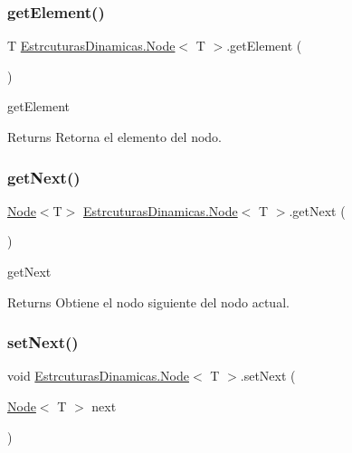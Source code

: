 \subsubsection{\texorpdfstring{get\+Element()}{getElement()}}
{\footnotesize\ttfamily T \mbox{\hyperlink{class_estrcuturas_dinamicas_1_1_node}{Estrcuturas\+Dinamicas.\+Node}}$<$ T $>$.get\+Element (\begin{DoxyParamCaption}{ }\end{DoxyParamCaption})}



get\+Element 

\begin{DoxyReturn}{Returns}
Retorna el elemento del nodo.
\end{DoxyReturn}
\mbox{\label{class_estrcuturas_dinamicas_1_1_node_a93966d358beb06f39a4b6648fda1d04c}} 
\subsubsection{\texorpdfstring{get\+Next()}{getNext()}}
{\footnotesize\ttfamily \mbox{\hyperlink{class_estrcuturas_dinamicas_1_1_node}{Node}}$<$T$>$ \mbox{\hyperlink{class_estrcuturas_dinamicas_1_1_node}{Estrcuturas\+Dinamicas.\+Node}}$<$ T $>$.get\+Next (\begin{DoxyParamCaption}{ }\end{DoxyParamCaption})}



get\+Next 

\begin{DoxyReturn}{Returns}
Obtiene el nodo siguiente del nodo actual.
\end{DoxyReturn}
\mbox{\label{class_estrcuturas_dinamicas_1_1_node_a4b40879d12a8659a42648db55b9fae34}} 
\subsubsection{\texorpdfstring{set\+Next()}{setNext()}}
{\footnotesize\ttfamily void \mbox{\hyperlink{class_estrcuturas_dinamicas_1_1_node}{Estrcuturas\+Dinamicas.\+Node}}$<$ T $>$.set\+Next (\begin{DoxyParamCaption}\item[{\mbox{\hyperlink{class_estrcuturas_dinamicas_1_1_node}{Node}}$<$ T $>$}]{next }\end{DoxyParamCaption})}



